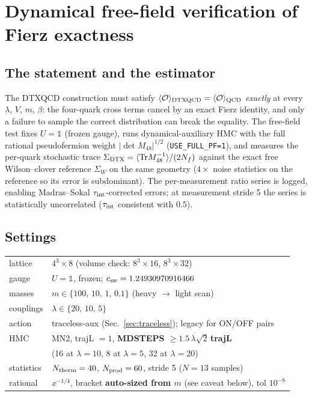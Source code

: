 \documentclass[11pt]{article}
\newcommand{\Tr}{\mathrm{Tr}}
\newcommand{\Sig}{\Sigma}
\begin{document}
\section{Dynamical free-field verification of Fierz exactness}
\label{sec:fierz}

\subsection{The statement and the estimator}

The DTXQCD construction must satisfy
$\langle\mathcal{O}\rangle_{\rm DTXQCD}=\langle\mathcal{O}\rangle_{\rm QCD}$
\emph{exactly} at every $\lambda$, $V$, $m$, $\beta$: the four-quark cross
terms cancel by an exact Fierz identity, and only a failure to sample the
correct distribution can break the equality.  The free-field test fixes
$U=\mathbb{1}$ (frozen gauge), runs dynamical-auxiliary HMC with the full
rational pseudofermion weight $|\det M_{48}|^{1/2}$
(\texttt{USE\_FULL\_PF=1}), and measures the per-quark stochastic trace
$\Sig_{\rm DTX}=\langle\Tr M_{48}^{-1}\rangle/(2N_{f})$ against the exact
free Wilson--clover reference $\Sig_{W}$ on the same geometry ($4\times$
noise statistics on the reference so its error is subdominant).  The
per-measurement ratio series is logged, enabling Madras--Sokal
$\tau_{\rm int}$-corrected errors; at measurement stride 5 the series is
statistically uncorrelated ($\tau_{\rm int}$ consistent with $0.5$).

\subsection{Settings}

\begin{center}
\begin{tabular}{ll}
\toprule
lattice & $4^{3}\times 8$ (volume check: $8^{3}\times16$, $8^{3}\times32$)\\
gauge & $U=\mathbb{1}$, frozen; $c_{\rm sw}=1.24930970916466$\\
masses & $m\in\{100,\,10,\,1,\,0.1\}$ (heavy $\to$ light scan)\\
couplings & $\lambda\in\{20,\,10,\,5\}$\\
action & traceless-aux (Sec.~\ref{sec:traceless}); legacy for ON/OFF pairs\\
HMC & MN2, trajL $=1$, \textbf{MDSTEPS $\ge 1.5\,\lambda\sqrt2\,$trajL}\\
 & (16 at $\lambda\!=\!10$, 8 at $\lambda\!=\!5$, 32 at $\lambda\!=\!20$)\\
statistics & $N_{\rm therm}=40$, $N_{\rm prod}=60$, stride 5 ($N=13$ samples)\\
rational & $x^{-1/4}$, bracket \textbf{auto-sized from $m$}
 (see caveat below), tol $10^{-8}$\\
\bottomrule
\end{tabular}
\end{center}
\end{document}
